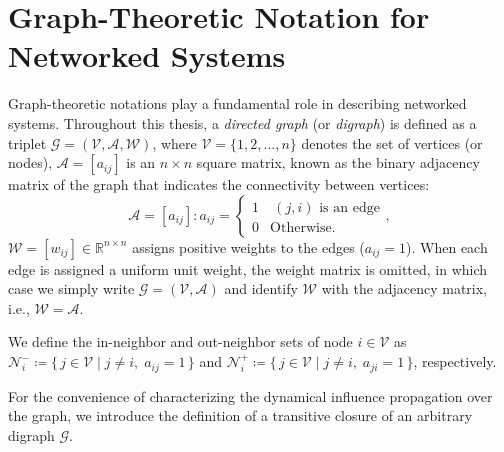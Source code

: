 
\section{Graph-Theoretic Notation for Networked Systems}

Graph-theoretic notations play a fundamental role in describing networked systems. Throughout this thesis, a \emph{directed graph} (or \emph{digraph}) is defined as a triplet \(\mathcal{G} = (\mathcal{V}, \mathcal{A}, \mathcal{W})\), 
where $\mathcal{V} = \{1,2,\dots,n\}$ denotes the set of vertices (or nodes), 
\(\mathcal{A} = \left[a_{ij}\right]\) is an \(n \times n\) square matrix, known as the binary adjacency matrix of the graph that indicates the connectivity between vertices:
\[
\mathcal{A} = \left[a_{ij}\right]\colon a_{ij} = \begin{cases}
1 & \ (j,i) \text{ is an edge}\\
0 & \text{Otherwise}.
\end{cases},
\]
\(\mathcal{W} = [w_{ij}] \in \mathbb{R}^{n\times n} \) assigns positive weights to the edges (\(a_{ij} = 1\)). When each edge is assigned a uniform unit weight, the weight matrix is omitted, in which case we simply write $\mathcal{G} = (\mathcal{V}, \mathcal{A})$ and identify $\mathcal{W}$ with the adjacency matrix, i.e., $\mathcal{W} = \mathcal{A}$.

We define the in-neighbor and out-neighbor sets of node $i \in \mathcal{V}$ as
\(\mathcal{N}_{i}^{-} \coloneqq \{\, j \in \mathcal{V} \mid j \neq i,\; a_{ij} = 1 \,\}\)
 and \(\mathcal{N}_{i}^{+} \coloneqq \{\, j \in \mathcal{V} \mid j \neq i,\; a_{ji} = 1 \,\}\),
respectively.

For the convenience of characterizing the dynamical influence propagation over the graph, we introduce the definition of a transitive closure of an arbitrary digraph \(\mathcal{G}\).


